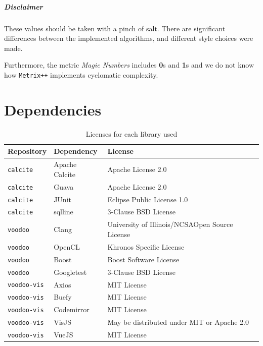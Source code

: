 \paragraph{Disclaimer} These values should be taken with a pinch of salt. There are significant differences between the implemented algorithms, and different style choices were made.

Furthermore, the metric \emph{Magic Numbers} includes \textbf{0}s and \textbf{1}s and we do not know how \texttt{Metrix++} implements cyclomatic complexity.

\chapter{Dependencies}

\begin{table}[h]
    \centering
    \begin{tabular}{l l l}
        \hline
        \textbf{Repository} & \textbf{Dependency} & \textbf{License} \\
        \hline
        \texttt{calcite}    & Apache Calcite & Apache License 2.0 \\
        \texttt{calcite}    & Guava          & Apache License 2.0 \\
        \texttt{calcite}    & JUnit          & Eclipse Public License 1.0 \\
        \texttt{calcite}    & sqlline        & 3-Clause BSD License \\ 
        \hline
        \texttt{voodoo}     & Clang          & University of Illinois/NCSAOpen Source License \\
        \texttt{voodoo}     & OpenCL         & Khronos Specific License \\
        \texttt{voodoo}     & Boost          & Boost Software License \\
        \texttt{voodoo}     & Googletest          & 3-Clause BSD License \\
        \hline
        \texttt{voodoo-vis} & Axios          & MIT License \\
        \texttt{voodoo-vis} & Buefy          & MIT License \\
        \texttt{voodoo-vis} & Codemirror     & MIT License \\
        \texttt{voodoo-vis} & VisJS          & May be distributed under MIT or Apache 2.0 \\
        \texttt{voodoo-vis} & VueJS          & MIT License \\
        \hline
    \end{tabular}
    \caption{\label{table:dependencies}Licenses for each library used}
\end{table}


